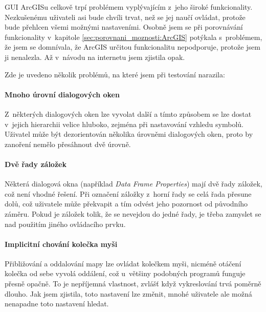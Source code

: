 \documentclass[a4paper,12pt,draft]{article}
\begin{document}
GUI ArcGISu celkově trpí problémem vyplývajícím z~jeho
široké funkcionality. Nezkušenému uživateli asi bude chvíli trvat,
 než se jej naučí ovládat, protože bude přehlcen všemi možnými
 nastaveními. Osobně jsem se při porovnávání funkcionality v~kapitole
 \ref{sec:porovnani_moznosti:ArcGIS} potýkala s~problémem, že jsem se
  domnívala, že ArcGIS určitou funkcionalitu nepodporuje, protože
 jsem ji nenalezla. Až v~návodu na internetu \cite{ArcGIS_help} jsem zjistila
opak.

Zde je uvedeno několik problémů, na které jsem při testování narazila:

\paragraph*{Mnoho úrovní dialogových oken} Z~některých dialogových oken
lze vyvolat další a tímto způsobem se lze dostat v~jejich hierarchii velice
hluboko, zejména při nastavování vzhledu symbolů.  Uživatel může být
dezorientován několika úrovněmi dialogových oken, proto by zanoření
nemělo přesáhnout dvě úrovně.

\paragraph*{Dvě řady záložek} Některá dialogová okna (například
\emph{Data Frame Properties}) mají dvě řady záložek, což není vhodné
řešení. Při označení záložky z~horní řady se celá řada přesune
dolů, což uživatele může překvapit a tím odvést jeho pozornost od
původního záměru. Pokud je záložek tolik, že se nevejdou do jedné
řady, je třeba zamyslet se nad použitím jiného ovládacího prvku.

\paragraph*{Implicitní chování kolečka myši} Přibližování a
oddalování mapy lze ovládat kolečkem myši, nicméně otáčení
kolečka od sebe vyvolá oddálení, což u~většiny podobných programů
funguje přesně opačně. To je nepříjemná vlastnost, zvlášť když
vykreslování trvá poměrně dlouho. Jak jsem zjistila, toto nastavení
lze změnit, mnohé uživatele ale možná nenapadne toto nastavení hledat.
\end{document}
